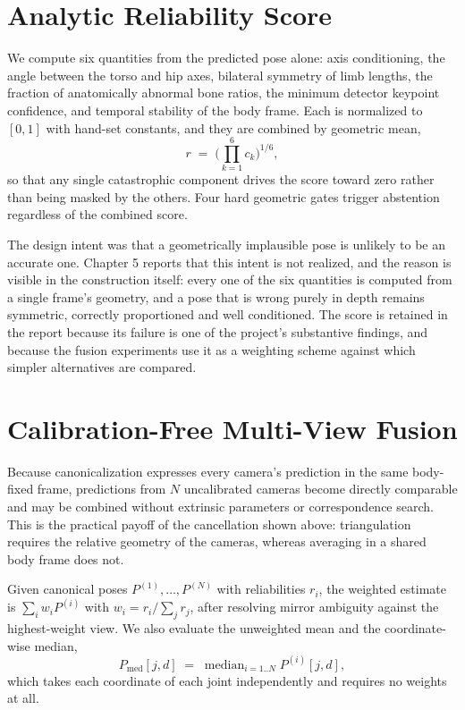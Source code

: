\documentclass[12pt,a4paper]{report}
\begin{document}
\section{Analytic Reliability Score}

We compute six quantities from the predicted pose alone: axis conditioning, the angle between the torso and hip axes, bilateral symmetry of limb lengths, the fraction of anatomically abnormal bone ratios, the minimum detector keypoint confidence, and temporal stability of the body frame. Each is normalized to $[0,1]$ with hand-set constants, and they are combined by geometric mean,
\begin{equation}
r \;=\; \Big(\prod_{k=1}^{6} c_k\Big)^{1/6},
\end{equation}
so that any single catastrophic component drives the score toward zero rather than being masked by the others. Four hard geometric gates trigger abstention regardless of the combined score.

The design intent was that a geometrically implausible pose is unlikely to be an accurate one. Chapter 5 reports that this intent is not realized, and the reason is visible in the construction itself: every one of the six quantities is computed from a single frame's geometry, and a pose that is wrong purely in depth remains symmetric, correctly proportioned and well conditioned. The score is retained in the report because its failure is one of the project's substantive findings, and because the fusion experiments use it as a weighting scheme against which simpler alternatives are compared.

\section{Calibration-Free Multi-View Fusion}

Because canonicalization expresses every camera's prediction in the same body-fixed frame, predictions from $N$ uncalibrated cameras become directly comparable and may be combined without extrinsic parameters or correspondence search. This is the practical payoff of the cancellation shown above: triangulation requires the relative geometry of the cameras, whereas averaging in a shared body frame does not.

Given canonical poses $P^{(1)},\dots,P^{(N)}$ with reliabilities $r_i$, the weighted estimate is $\sum_i w_i P^{(i)}$ with $w_i = r_i / \sum_j r_j$, after resolving mirror ambiguity against the highest-weight view. We also evaluate the unweighted mean and the coordinate-wise median,
\begin{equation}
P_{\text{med}}[j,d] \;=\; \operatorname{median}_{i=1..N} P^{(i)}[j,d],
\end{equation}
which takes each coordinate of each joint independently and requires no weights at all.
\end{document}
